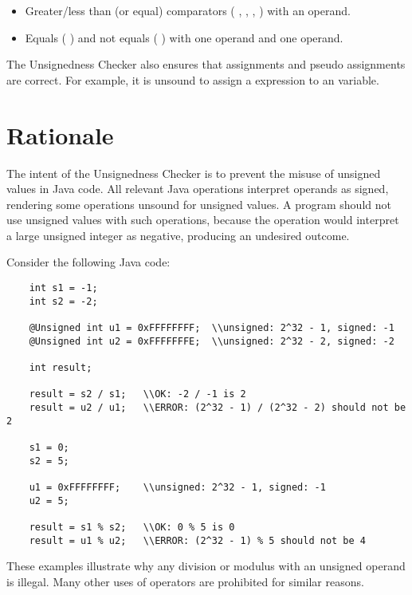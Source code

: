 \begin{itemize}

    \item   
    Greater/less than (or equal) comparators
    ( \code{<}, \code{<=}, \code{>}, \code{>=} ) with an 
    operand.
    \item   
    Equals ( \code{==} ) and not equals ( \code{!=} ) with one 
    operand and one  operand.

\end{itemize}

The Unsignedness Checker also ensures that assignments and pseudo assignments are
correct. For example, it is unsound to assign a  expression to an
 variable.

\section{Rationale\label{unsignedness-checker-rationale}}

The intent of the Unsignedness Checker is to prevent the misuse of unsigned
values in Java code. All relevant Java operations interpret operands as signed,
rendering some operations unsound for unsigned values. A program should not use
unsigned values with such operations, because the operation would interpret a
large unsigned integer as negative, producing an undesired outcome.

Consider the following Java code:

\begin{Verbatim}
    int s1 = -1;
    int s2 = -2;

    @Unsigned int u1 = 0xFFFFFFFF;  \\unsigned: 2^32 - 1, signed: -1
    @Unsigned int u2 = 0xFFFFFFFE;  \\unsigned: 2^32 - 2, signed: -2

    int result;

    result = s2 / s1;   \\OK: -2 / -1 is 2
    result = u2 / u1;   \\ERROR: (2^32 - 1) / (2^32 - 2) should not be 2

    s1 = 0;
    s2 = 5;

    u1 = 0xFFFFFFFF;    \\unsigned: 2^32 - 1, signed: -1
    u2 = 5;

    result = s1 % s2;   \\OK: 0 % 5 is 0
    result = u1 % u2;   \\ERROR: (2^32 - 1) % 5 should not be 4
\end{Verbatim}

These examples illustrate why any division or modulus with an unsigned operand 
is illegal. Many other uses of operators are prohibited for similar reasons.